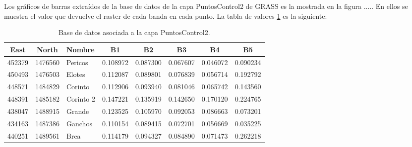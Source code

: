 Los gráficos de barras extraídos de la base de datos de la capa PuntosControl2 de GRASS es la mostrada en la figura ..... En ellos se muestra el valor que devuelve el raster de cada banda en cada punto. La tabla de valores \ref{tab:tabla_puntos} es la siguiente:

\begin{table}[ht]
	\centering
	\caption[Base de datos de puntos de control]{Base de datos asociada a la capa PuntosControl2.}
	\begin{tabular}{@{}cclccccc@{}}
	\toprule[0.4mm]
	East & North & Nombre & B1 & B2 & B3 & B4 & B5\\
	\midrule
	452379 & 1476560 & Pericos & 0.108972 & 0.087300 & 0.067607 & 0.046072 & 0.090234\\
	450493 & 1476503 & Elotes & 0.112087 & 0.089801 & 0.076839 & 0.056714 & 0.192792\\
	448571 & 1484829 & Corinto & 0.112906 & 0.093940 & 0.081046 & 0.065742 & 0.143560\\
	448391 & 1485182 & Corinto 2 & 0.147221 & 0.135919 & 0.142650 & 0.170120 & 0.224765\\
	438047 & 1488915 & Grande & 0.123525 & 0.105970 & 0.092053 & 0.086663 & 0.073201\\
	434163 & 1487386 & Ganchos & 0.110154 & 0.089415 & 0.072701 & 0.056669 & 0.035225\\
	440251 & 1489561 & Brea & 0.114179 & 0.094327 & 0.084890 & 0.071473 & 0.262218\\
	\bottomrule[0.4mm]
	\end{tabular}
	\label{tab:tabla_puntos}
\end{table}